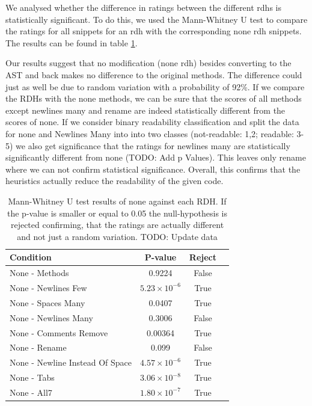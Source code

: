 \documentclass[%
class=scrreprt,
chapterprefix=false,%
open=right,%
twoside=false,%
paper=a4,%
logofile={Logo\_zentral\_farbig\_EN.png},%
thesistype=master,%
UKenglish,%
]{se2thesis}
\theoremstyle{definition}
\begin{document}
	We analysed whether the difference in ratings between the different rdhs is statistically significant. To do this, we used the Mann-Whitney U test to compare the ratings for all snippets for an rdh with the corresponding none rdh snippets. The results can be found in table \ref{tab:survey_statistical_evidence}.
		
	Our results suggest that no modification (none rdh) besides converting to the AST and back makes no difference to the original methods. The difference could just as well be due to random variation with a probability of 92\%. If we compare the RDHs with the none methods, we can be sure that the scores of all methods except newlines many and rename are indeed statistically different from the scores of none. If we consider binary readability classification and split the data for none and Newlines Many into into two classes (not-readable: 1,2; readable: 3-5) we also get significance that the ratings for newlines many are statistically significantly different from none (TODO: Add p Values). This leaves only rename where we can not confirm statistical significance. Overall, this confirms that the heuristics actually reduce the readability of the given code.
	
	\begin{table}[h]
		\centering
		\begin{tabular}{lccc}
			\toprule
			\textbf{Condition} & \textbf{P-value} & \textbf{Reject} \\
			\midrule
			None - Methods & 0.9224 & False \\
			None - Newlines Few & $5.23 \times 10^{-6}$ & True \\
			None - Spaces Many & 0.0407 & True \\
			None - Newlines Many & 0.3006 & False \\
			None - Comments Remove & 0.00364 & True \\
			None - Rename & 0.099 & False \\
			None - Newline Instead Of Space & $4.57 \times 10^{-6}$ & True \\
			None - Tabs & $3.06 \times 10^{-8}$ & True \\
			None - All7 & $1.80 \times 10^{-7}$ & True \\
			\bottomrule
		\end{tabular}
		\caption{Mann-Whitney U test results of none against each RDH. If the p-value is smaller or equal to 0.05 the null-hypothesis is rejected confirming, that the ratings are actually different and not just a random variation. TODO: Update data}
		\label{tab:survey_statistical_evidence}
	\end{table}
	
\end{document}
